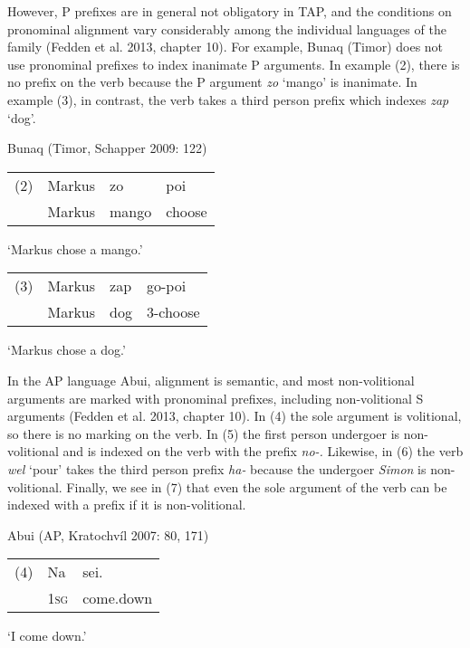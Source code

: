 However, P prefixes are in general not obligatory in TAP, and the conditions on pronominal alignment vary considerably among the individual languages of the family (Fedden et al. 2013, chapter 10). For example, Bunaq (Timor) does not use pronominal prefixes to index inanimate P arguments. In example (2), there is no prefix on the verb because the P argument \textit{zo }{\textquoteleft}mango{\textquoteright} is inanimate. In example (3), in contrast, the verb takes a third person prefix which indexes \textit{zap} {\textquoteleft}dog{\textquoteright}.

Bunaq (Timor, Schapper 2009: 122)

\begin{flushleft}
\tablehead{}
\begin{supertabular}{m{0.36155984in}m{0.5462598in}m{0.5288598in}m{0.6712598in}}
(2) &
Markus &
zo &
poi\\
 &
Markus &
mango  &
choose\\
\end{supertabular}
\end{flushleft}
{\textquoteleft}Markus chose a mango.{\textquoteright} 

\begin{flushleft}
\tablehead{}
\begin{supertabular}{m{0.36155984in}m{0.5469598in}m{0.29625985in}m{0.6712598in}}
(3) &
Markus &
zap &
go-poi\\
 &
Markus &
dog &
\textsc{3}{}-choose\\
\end{supertabular}
\end{flushleft}
{\textquoteleft}Markus chose a dog.{\textquoteright} 

In the AP language Abui, alignment is semantic, and most non-volitional arguments are marked with pronominal prefixes, including non-volitional S arguments (Fedden et al. 2013, chapter 10). In (4) the sole argument is volitional, so there is no marking on the verb. In (5) the first person undergoer is non-volitional and is indexed on the verb with the prefix \textit{no-.} Likewise, in (6) the verb \textit{wel }{\textquoteleft}pour{\textquoteright} takes the third person prefix \textit{ha-} because the undergoer \textit{Simon} is non-volitional. Finally, we see in (7) that even the sole argument of the verb can be indexed with a prefix if it is non-volitional.

Abui (AP, Kratochv\'il 2007: 80, 171)

\begin{flushleft}
\tablehead{}
\begin{supertabular}{m{0.39005986in}m{0.30735984in}m{0.78095984in}}
(4) &
Na &
sei.\\
 &
\textsc{1sg} &
come.down\\
\end{supertabular}
\end{flushleft}
{\textquoteleft}I come down.{\textquoteright} 

